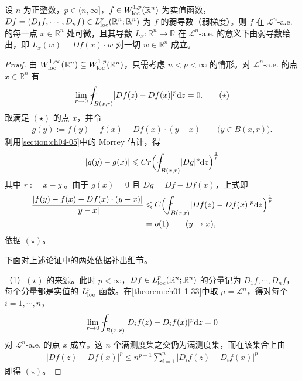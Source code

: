 \documentclass[../../main.tex]{subfiles}%
\begin{document}
\begin{theorem}[几乎处处可微性]\label{theorem:ch06-6-5}
设 $n$ 为正整数，$p\in(n,\infty]$，$f\in W^{1,p}_{\mathrm{loc}}(\mathbb{R}^n)$ 为实值函数，$Df=(D_{1}f,\cdots,D_{n}f)\in L^{p}_{\mathrm{loc}}(\mathbb{R}^n;\mathbb{R}^n)$ 为 $f$ 的弱导数（弱梯度）。则 $f$ 在 $\mathcal{L}^{n}$-a.e. 的每一点 $x\in\mathbb{R}^n$ 处可微，且其导数 $L_{x}:\mathbb{R}^n\to\mathbb{R}$ 在 $\mathcal{L}^{n}$-a.e. 的意义下由弱导数给出，即 $L_{x}(w)=Df(x)\cdot w$ 对一切 $w\in\mathbb{R}^n$ 成立。
\end{theorem}

\begin{proof}
由 $W^{1,\infty}_{\mathrm{loc}}(\mathbb{R}^n)\subseteq W^{1,p}_{\mathrm{loc}}(\mathbb{R}^n)$，只需考虑 $n<p<\infty$ 的情形。对 $\mathcal{L}^{n}$-a.e. 的点 $x\in\mathbb{R}^n$ 有
\begin{align*}
\lim_{r\to0}\fint_{B(x,r)}\lvert Df(z)-Df(x)\rvert^{p}\diff z=0.\qquad(\star)
\end{align*}
取满足 $(\star)$ 的点 $x$，并令
\begin{align*}
g(y):=f(y)-f(x)-Df(x)\cdot(y-x)\qquad\bigl(y\in B(x,r)\bigr).
\end{align*}
利用\cref{section:ch04-05}中的 Morrey 估计，得%
\begin{align*}
\lvert g(y)-g(x)\rvert\leqslant Cr\Bigl(\fint_{B(x,r)}\lvert Dg\rvert^{p}\diff z\Bigr)^{\frac{1}{p}}
\end{align*}
其中 $r:=\lvert x-y\rvert$。由于 $g(x)=0$ 且 $Dg=Df-Df(x)$，上式即
\begin{align*}
\frac{\lvert f(y)-f(x)-Df(x)\cdot(y-x)\rvert}{\lvert y-x\rvert}
&\leqslant C\Bigl(\fint_{B(x,r)}\lvert Df(z)-Df(x)\rvert^{p}\diff z\Bigr)^{\frac{1}{p}}\\
&=o(1)\qquad(y\to x),
\end{align*}
依据 $(\star)$。

下面对上述论证中的两处依据补出细节。

（1）$(\star)$ 的来源。此时 $p<\infty$，$Df\in L^{p}_{\mathrm{loc}}(\mathbb{R}^n;\mathbb{R}^n)$ 的分量记为 $D_{1}f,\cdots,D_{n}f$，每个分量都是实值的 $L^{p}_{\mathrm{loc}}$ 函数。在\cref{theorem:ch01-1-33}中取 $\mu=\mathcal{L}^{n}$，得对每个 $i=1,\cdots,n$，%
\begin{align*}
\lim_{r\to0}\fint_{B(x,r)}\lvert D_{i}f(z)-D_{i}f(x)\rvert^{p}\diff z=0
\end{align*}
对 $\mathcal{L}^{n}$-a.e. 的点 $x$ 成立。这 $n$ 个满测度集之交仍为满测度集，而在该集合上由
\begin{align*}
\lvert Df(z)-Df(x)\rvert^{p}\leqslant n^{p-1}\sum_{i=1}^{n}\lvert D_{i}f(z)-D_{i}f(x)\rvert^{p}
\end{align*}
即得 $(\star)$。


\end{proof}
\end{document}
